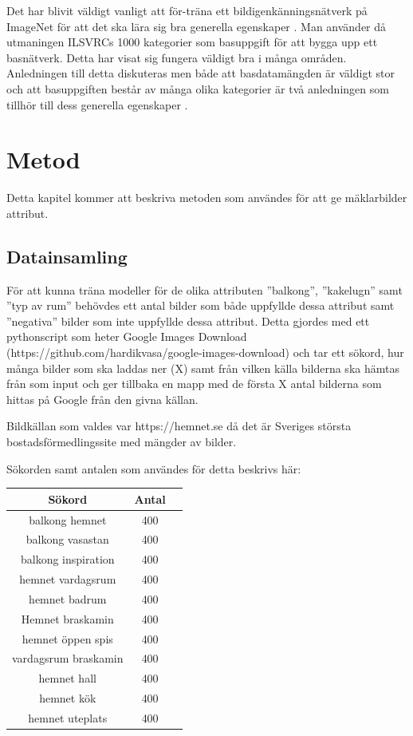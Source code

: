 \documentclass[]{kththesis}
\begin{document}
Det har blivit väldigt vanligt att för-träna ett bildigenkänningsnätverk på ImageNet för att det ska lära sig bra generella egenskaper \parencite{huh2016makes}. Man använder då utmaningen ILSVRCs 1000 kategorier som basuppgift för att bygga upp ett basnätverk. Detta har visat sig fungera väldigt bra i många områden. Anledningen till detta diskuteras men både att basdatamängden är väldigt stor och att basuppgiften består av många olika kategorier är två anledningen som tillhör till dess generella egenskaper \parencite{huh2016makes}. 

\chapter{Metod}
Detta kapitel kommer att beskriva metoden som användes för att ge mäklarbilder attribut.


\section{Datainsamling}
För att kunna träna modeller för de olika attributen ”balkong”, ”kakelugn” samt ”typ av rum” behövdes ett antal bilder som både uppfyllde dessa attribut samt ”negativa” bilder som inte uppfyllde dessa attribut.
Detta gjordes med ett pythonscript som heter Google Images Download (https://github.com/hardikvasa/google-images-download) och tar ett sökord, hur många bilder som ska laddas ner (X) samt från vilken källa bilderna ska hämtas från som input och ger tillbaka en mapp med de första X antal bilderna som hittas på Google från den givna källan. 

Bildkällan som valdes var https://hemnet.se då det är Sveriges största bostadsförmedlingssite med mängder av bilder.

Sökorden samt antalen som användes för detta beskrivs här:

\begin{center}
  \begin{tabular}{ |c|c|c| } 
   \hline
   Sökord & Antal \\ 
   \hline
   balkong hemnet & 400  \\ 
   \hline
   balkong vasastan & 400 \\ 
   \hline
   balkong inspiration & 400 \\ 
   \hline
   hemnet vardagsrum & 400  \\ 
   \hline
   hemnet badrum & 400 \\ 
   \hline
   Hemnet braskamin & 400  \\ 
   \hline
   hemnet öppen spis & 400 \\ 
   \hline
   vardagsrum braskamin & 400 \\ 
   \hline
   hemnet hall & 400 \\ 
   \hline
   hemnet kök & 400 \\ 
   \hline
   hemnet uteplats & 400   \\ 
   \hline 
  \end{tabular}
  \end{center}
\end{document}
